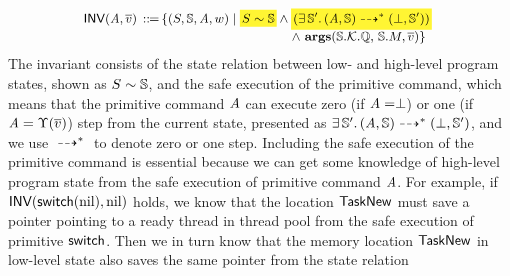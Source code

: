 \[
    \small
    \begin{array}{l}
        \!\!
        \INV{(\primcom, \args{\val})} \, \define \,
        \{
            (\state, \hpstate, \primcom, \word) \sepline
            \colorbox{yellow!80}{\!$\stateRel{\state}{\hpstate}$\!}
            \land
            \colorbox{yellow!80}
            {\!\!\!
                $(\exists \, \hpstate'. \,
                \primMultiTrans
                    {(\primcom, \hpstate)}
                    {*}{(\primdone, \hpstate')})$
            \!\!\!} \\
            \hspace*{15.8em}
            \land \
            \arguments(\hpstate.\hthrdlocalst.\hRstate, \,
            \hpstate.\Mem, \args{\val})
        \}
    \end{array}
\]
The invariant consists of the state relation between low- and
high-level program states,
shown as ${S} \sim {\mathbb{S}}$, 
{\color{blue} and the safe execution of the primitive 
command, which means that 
the primitive command $\textit{A}$ can execute 
zero (if $\textit{A} = \perp$)
or one (if $\textit{A} = \Upsilon(\overline{v})$) 
step from the current state, presented as 
$\exists \, \mathbb{S}'. \,
    {(\textit{A}, \mathbb{S})} \dashrightarrow^{*} {(\perp, \mathbb{S}')}$, 
and we use ${} \dashrightarrow^{*} {}$ to denote
zero or one step.}
Including the safe execution of
the primitive command is essential
because we can get some knowledge of high-level program
state from the safe execution of
primitive command $\textit{A}$.
For example, if $\textsf{INV}{(\mathsf{switch}(\text{nil}), \text{nil})}$
holds, we know that the location $\mathsf{TaskNew}$
must save a pointer pointing to a ready thread
in thread pool from the safe execution of primitive $\mathsf{switch}$.
Then we in turn know that the memory location $\mathsf{TaskNew}$
in low-level state also saves the same pointer
from the state relation

